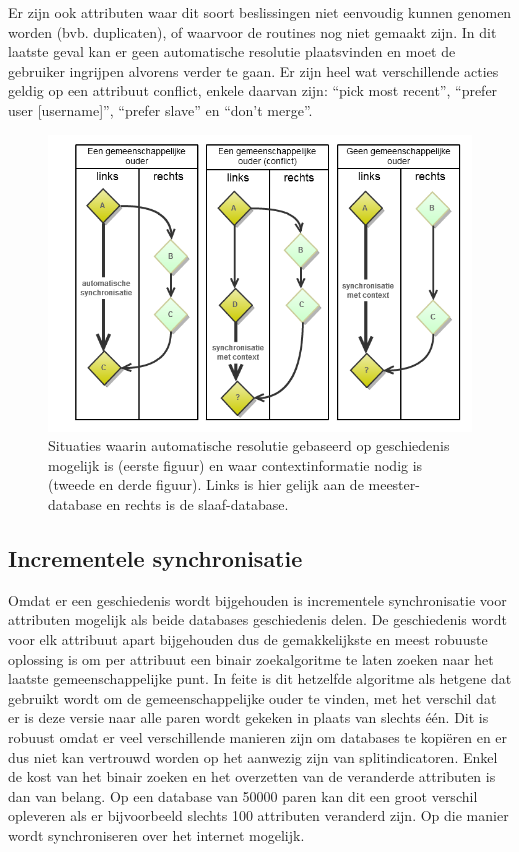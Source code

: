 Er zijn ook attributen waar dit soort beslissingen niet eenvoudig kunnen genomen worden (bvb. duplicaten), of waarvoor de routines nog niet gemaakt zijn. In dit laatste geval kan er geen automatische resolutie plaatsvinden en moet de gebruiker ingrijpen alvorens verder te gaan. Er zijn heel wat verschillende acties geldig op een attribuut conflict, enkele daarvan zijn: ``pick most recent'', ``prefer user [username]'', ``prefer slave'' en ``don't merge''.

\begin{figure}[ht]
	\begin{center}
		\includegraphics[width=1.0\columnwidth]{images/3-way-merge.png}
		\caption{Situaties waarin automatische resolutie gebaseerd op geschiedenis mogelijk is (eerste figuur) en waar contextinformatie nodig is (tweede en derde figuur). Links is hier gelijk aan de meester-database en rechts is de slaaf-database.}
		\label{fig:okay-3-way}
	\end{center}
\end{figure}

\subsection{Incrementele synchronisatie}
Omdat er een geschiedenis wordt bijgehouden is incrementele synchronisatie voor attributen mogelijk als beide databases geschiedenis delen. De geschiedenis wordt voor elk attribuut apart bijgehouden dus de gemakkelijkste en meest robuuste oplossing is om per attribuut een binair zoekalgoritme te laten zoeken naar het laatste gemeenschappelijke punt. In feite is dit hetzelfde algoritme als hetgene dat gebruikt wordt om de gemeenschappelijke ouder te vinden, met het verschil dat er is deze versie naar alle paren wordt gekeken in plaats van slechts \'e\'en. Dit is robuust omdat er veel verschillende manieren zijn om databases te kopi\"eren en er dus niet kan vertrouwd worden op het aanwezig zijn van splitindicatoren. Enkel de kost van het binair zoeken en het overzetten van de veranderde attributen is dan van belang. Op een database van 50000 paren kan dit een groot verschil opleveren als er bijvoorbeeld slechts 100 attributen veranderd zijn. Op die manier wordt synchroniseren over het internet mogelijk. 